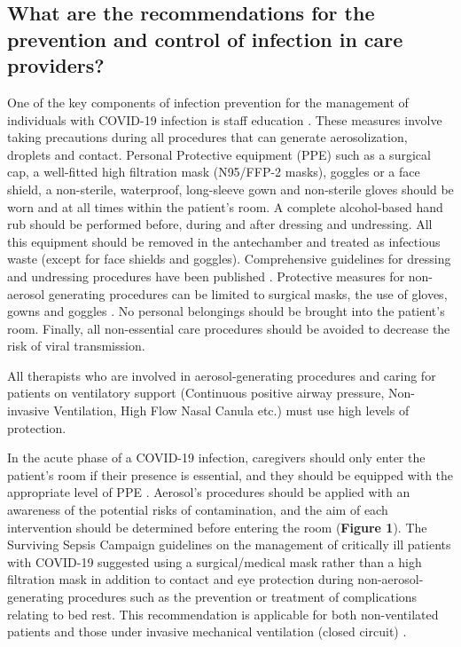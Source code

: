 \subsection{What are the recommendations for the prevention and control of infection in care providers?}
One of the key components of infection prevention for the management of individuals with COVID-19 infection is staff education \cite{bouadma_severe_2020}. These measures involve taking precautions during all procedures that can generate aerosolization, droplets and contact. Personal Protective equipment (PPE) such as a surgical cap, a well-fitted high filtration mask (N95/FFP-2 masks), goggles or a face shield, a non-sterile, waterproof, long-sleeve gown and non-sterile gloves should be worn and at all times within the patient’s room. A complete alcohol-based hand rub should be performed before, during and after dressing and undressing. All this equipment should be removed in the antechamber and treated as infectious waste (except for face shields and goggles). Comprehensive guidelines for dressing and undressing procedures have been published \cite{bouadma_severe_2020}. Protective measures for non-aerosol generating procedures can be limited to surgical masks, the use of gloves, gowns and goggles \cite{long_effectiveness_2020}. No personal belongings should be brought into the patient’s room. Finally, all non-essential care procedures should be avoided to decrease the risk of viral transmission.

All therapists who are involved in aerosol-generating procedures and caring for patients on ventilatory support (Continuous positive airway pressure, Non-invasive Ventilation, High Flow Nasal Canula etc.) must use high levels of protection.

In the acute phase of a COVID-19 infection, caregivers should only enter the patient’s room if their presence is essential, and they should be equipped with the appropriate level of PPE \cite{wang2020challenges}. Aerosol’s procedures should be applied with an awareness of the potential risks of contamination, and the aim of each intervention should be determined before entering the room (\textbf{Figure 1}). The Surviving Sepsis Campaign guidelines on the management of critically ill patients with COVID-19 suggested using a surgical/medical mask rather than a high filtration mask in addition to contact and eye protection during non-aerosol-generating procedures such as the prevention or treatment of complications relating to bed rest. This recommendation is applicable for both non-ventilated patients and those under invasive mechanical ventilation (closed circuit) \cite{alhazzani_surviving_2020}. 

